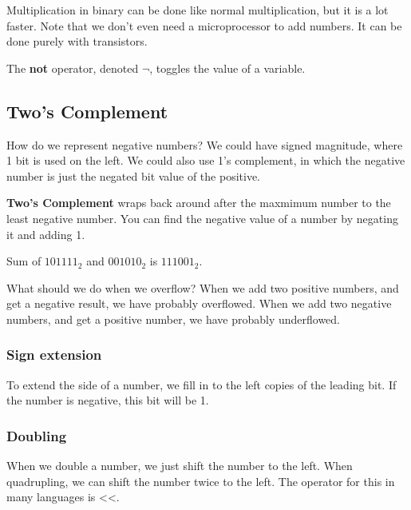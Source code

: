 
Multiplication in binary can be done like normal multiplication, but it is a lot faster. Note that we don't even need a microprocessor to add numbers. It can be done purely with transistors.

\begin{definition}
	The \textbf{not} operator, denoted \( \neg \), toggles the value of a variable.
\end{definition}

\subsection{Two's Complement}

How do we represent negative numbers? We could have signed magnitude, where 1 bit is used on the left. We could also use 1's complement, in which the negative number is just the negated bit value of the positive.

\begin{definition}
	\textbf{Two's Complement} wraps back around after the maxmimum number to the least negative number. You can find the negative value of a number by negating it and adding 1.
\end{definition}

\begin{eg}
	Sum of \( 101111_2 \) and \( 001010_2 \) is \( 111001_2 \).
\end{eg}

What should we do when we overflow? When we add two positive numbers, and get a negative result, we have probably overflowed. When we add two negative numbers, and get a positive number, we have probably underflowed.

\subsubsection{Sign extension}

To extend the side of a number, we fill in to the left copies of the leading bit. If the number is negative, this bit will be 1.

\subsubsection{Doubling}

When we double a number, we just shift the number to the left. When quadrupling, we can shift the number twice to the left. The operator for this in many languages is <<.

